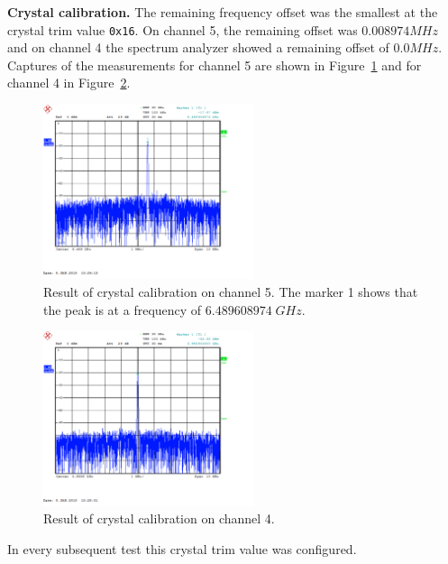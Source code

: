 \documentclass[journal,comsoc]{IEEEtran}
\begin{document}
\vspace*{0.5em}
\noindent\textbf{Crystal calibration.} The remaining frequency offset was the smallest at the crystal trim value \texttt{0x16}. 
On channel 5, the remaining offset was $0.008974MHz$ and on channel 4 the spectrum analyzer showed a remaining offset of $0.0MHz$.
Captures of the measurements for channel 5 are shown in Figure~\ref{fig:resxtaltrim5} and for channel 4 in Figure~\ref{fig:resxtaltrim4}.
\begin{figure}
	\centering
	\includegraphics[width=0.55\textwidth]{Figures/07_XTALTRIM}
	\caption{Result of crystal calibration on channel 5. The marker 1 shows that the peak is at a frequency of $6.489608974 \; GHz$.}
	\label{fig:resxtaltrim5}
\end{figure}
\begin{figure}
	\centering
	\includegraphics[width=0.55\textwidth]{Figures/07_XTALTRIM_CH4}
	\caption{Result of crystal calibration on channel 4.}
	\label{fig:resxtaltrim4}
\end{figure}
In every subsequent test this crystal trim value was configured.
\end{document}
